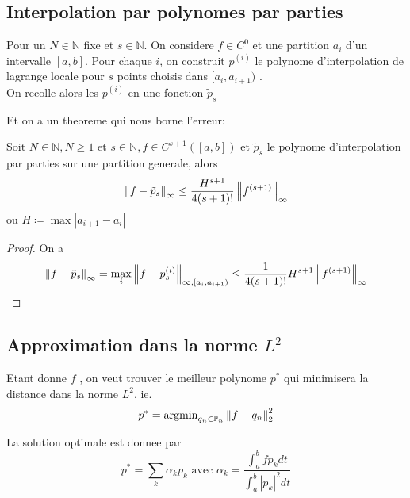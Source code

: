 \documentclass[../main.tex]{subfiles}
\begin{document}
\subsection{Interpolation par polynomes par parties}
\begin{defn}
	Pour un $N \in \mathbb{N}$ fixe et $s \in \mathbb{N}$. On considere $ f\in C^{0}$ et une partition $a_i$ d'un intervalle $ [ a,b] $. Pour chaque $ i$, on construit $p^{( i )}$  le polynome d'interpolation de lagrange locale pour $ s$ points choisis dans $ [ a_i, a_{i+1} ) $ .\\
	On recolle  alors les $ p^{( i) }$ en une fonction $ \tilde{p}_s$ 
\end{defn}
Et on a un theoreme qui nous borne l'erreur:
\begin{thm}
	Soit $ N \in \mathbb{N}, N \geq 1$ et $s\in \mathbb{N}, f \in C^{s+1}( [ a,b] ) $ et $ \tilde{p}_s$ le polynome d'interpolation par parties sur une partition generale, alors
	\[ 
	\left\lVert f - \tilde { p} _s\right\rVert _{ \infty } \leq  \frac{H^{s+1}}{4 ( s+1) !}\left\lVert f^{( s+1) }\right\rVert _{ \infty } 
	\]
	ou $ H \coloneqq  \max |a_{i+1} -a_i|$ 
\end{thm}
\begin{proof}
On a
\[ 
\left\lVert f- \tilde { p} _s\right\rVert _{ \infty } = \max_i \left\lVert f- p_s^{ ( i) }\right\rVert _{ \infty , [ a_i, a_{i+1} ) } \leq  \frac{1}{4 ( s+1) !} H^{s+1}\left\lVert f^{( s+1) }\right\rVert _{ \infty } 
\]

\end{proof}
\subsection{Approximation dans la norme $ L^{2}$ }
Etant donne $f$ , on veut trouver le meilleur polynome $ p^{\ast}$ qui minimisera la distance dans la norme $ L^{2}$, ie.
\[ 
	p^{\ast} = \mathrm{argmin}_{q_n \in \mathbb{P}_n} \left\lVert f- q_n\right\rVert _2^{2}
\]
\begin{thm}
	La solution optimale est donnee par
	\[ 
	p^{\ast} = \sum_k \alpha_k p_k \text{ avec } \alpha_k = \frac{ \int_{ a }^{ b }f p_k dt}{\int_{ a }^{ b }|p_k|^{2}dt}
	\]
		
\end{thm}
\end{document}
